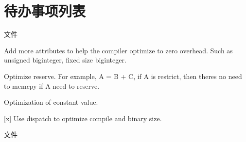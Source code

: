 \chapter{待办事项列表}
\hypertarget{todo}{}\label{todo}

\begin{DoxyRefList}
\item[文件 \doxylink{biginteger_2biginteger_8hpp}{biginteger.hpp} ]\label{todo__todo000004}%
%

\begin{DoxyEnumerate}
\item Add more attributes to help the compiler optimize to zero overhead. Such as unsigned biginteger, fixed size biginteger.
\item Optimize reserve. For example, A = B + C, if A is restrict, then there\textquotesingle{}s no need to memcpy if A need to reserve.
\item Optimization of constant value.
\item \mbox{[}x\mbox{]} Use dispatch to optimize compile and binary size. 
\end{DoxyEnumerate}
\item[文件 \doxylink{btree_8hpp}{btree.hpp} ]\label{todo__todo000015}%
%


\end{DoxyRefList}
